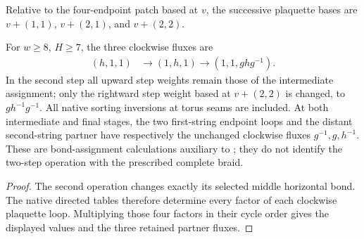 \begin{definition}
    \label{def:peps_two_step_string_plaquettes}
    \leanok
    Relative to the four-endpoint patch based at $v$, the successive plaquette
    bases are $v+(1,1)$, $v+(2,1)$, and $v+(2,2)$.
\end{definition}
\begin{lemma}
    \label{thm:peps_two_step_string_route_holonomy}
    \leanok
    For $w\ge8$, $H\ge7$, the three clockwise fluxes are
    \begin{align}
        (h,1,1) & \longrightarrow(1,h,1)
        \longrightarrow(1,1,ghg^{-1}).
    \end{align}
    In the second step all upward step weights remain those of the intermediate
    assignment; only the rightward step weight based at $v+(2,2)$ is changed,
    to $gh^{-1}g^{-1}$. All native sorting inversions at torus seams are
    included. At both intermediate and final stages, the two first-string
    endpoint loops and the distant second-string partner have respectively
    the unchanged clockwise fluxes $g^{-1},g,h^{-1}$.
    These are bond-assignment calculations auxiliary to
    \cite[Section~6.6]{Schuch2010PEPS}; they do not identify the two-step
    operation with the prescribed complete braid.
\end{lemma}
\begin{proof}
    \leanok
    The second operation changes exactly its selected middle horizontal bond.
    The native directed tables therefore determine every factor of each
    clockwise plaquette loop. Multiplying those four factors in their cycle
    order gives the displayed values and the three retained partner fluxes.
\end{proof}
